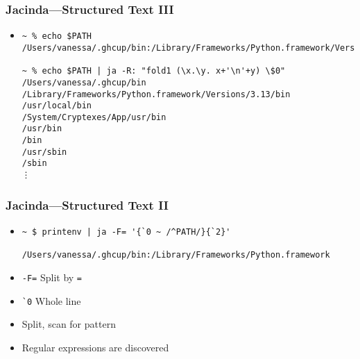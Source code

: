\documentclass{beamer}
\begin{document}
\begin{frame}[fragile]
  \frametitle{Jacinda---Structured Text III}
  \begin{itemize}
    \item
      \begin{verbatim}
~ % echo $PATH
/Users/vanessa/.ghcup/bin:/Library/Frameworks/Python.framework/Versions/3.13/bin:/Library/Frameworks/Python.framework/Versions/3.12/bin:/Library/Frameworks/Python.framework/Versions/3.11/bin:/Library/Frameworks/Python.framework/Versions/3.10/bin:/usr/local/bin:/System/Cryptexes/App/usr/bin:/usr/bin:/bin:/usr/sbin:/sbin:/var/run/com.apple.security.cryptexd/codex.system/bootstrap/usr/local/bin:/var/run/com.apple.security.cryptexd/codex.system/bootstrap/usr/bin:/var/run/com.apple.security.cryptexd/codex.system/bootstrap/usr/appleinternal/bin:/opt/X11/bin:/Library/TeX/texbin:/usr/local/go/bin:/Users/vanessa/.cpm/bin:/Users/vanessa/pakcs/bin:/Users/vanessa/.local/bin:/Users/vanessa/.cargo/bin:/Applications/iTerm.app/Contents/Resources/utilities:/Applications/CMake.app/Contents/bin:/Users/vanessa/.fzf/bin

~ % echo $PATH | ja -R: "fold1 (\x.\y. x+'\n'+y) \$0"
/Users/vanessa/.ghcup/bin
/Library/Frameworks/Python.framework/Versions/3.13/bin
/usr/local/bin
/System/Cryptexes/App/usr/bin
/usr/bin
/bin
/usr/sbin
/sbin
⋮
      \end{verbatim}
  \end{itemize}
\end{frame}

\begin{frame}[fragile]
  \frametitle{Jacinda---Structured Text II}
  \begin{itemize}
    \item
      \begin{verbatim}
~ $ printenv | ja -F= '{`0 ~ /^PATH/}{`2}'

/Users/vanessa/.ghcup/bin:/Library/Frameworks/Python.framework
      \end{verbatim}
    \item \verb|-F=| Split by \verb|=|
    \item \verb|`0| Whole line
    \item Split, scan for pattern
    \item Regular expressions are discovered
  \end{itemize}
\end{frame}

\end{document}
